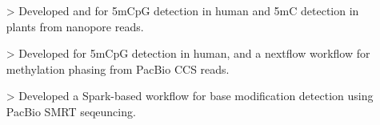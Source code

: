 \documentclass{resume}
\begin{document}
\begin{itemize}
    \item[>] Developed  and  for 5mCpG detection in human and 5mC detection in plants from nanopore reads.
    \item[>] Developed  for 5mCpG detection in human, and a nextflow workflow  for methylation phasing from PacBio CCS reads.
    \item[>] Developed a Spark-based workflow  for base modification detection using PacBio SMRT seqeuncing.
  \end{itemize}
\end{document}
